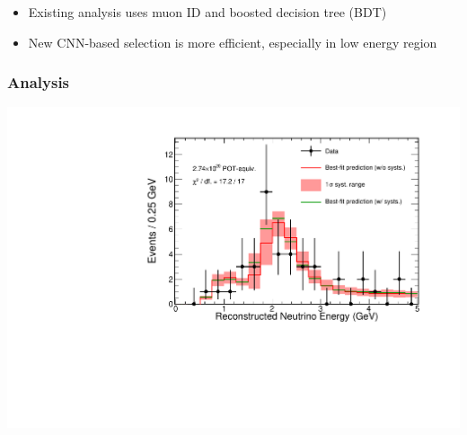 \documentclass[10pt,professionalfonts,xcolor=table]{beamer}
\begin{document}
\begin{frame}
\begin{columns}
\end{columns}
\gap
  \begin{itemize}
  \item Existing \nova analysis uses muon ID and boosted decision tree (BDT)
  \gap
  \item New CNN-based selection is more efficient, especially in low energy region
  \end{itemize}
\end{frame}

\begin{frame}
\end{frame}


\begin{frame}
\frametitle{Analysis}
\begin{center}
\vspace{-10pt}
\includegraphics[width=.45\textheight, angle=-90]{figures/results/spectrum_fit_systs.pdf}
\end{center}

\begin{itemize}


\end{itemize}
\end{frame}
\end{document}
